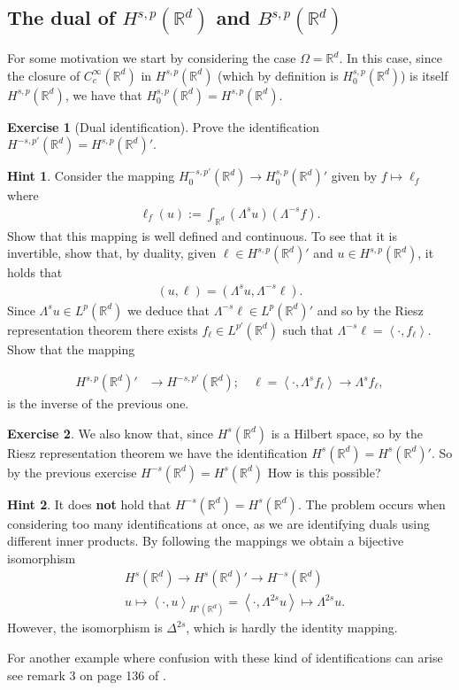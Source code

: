\documentclass[
    a4paper,
    DIV=14,
    abstract=true,
    numbers=noenddot
]
{scrartcl}
\theoremstyle{definition}
\newtheorem{exercise}{Exercise}
\newtheorem*{hint}{Hint}
\newcommand{\br}[1]{\left\langle#1\right\rangle}
\newcommand{\R}{\mathbb{R}}
\begin{document}
\subsection{The dual of $H^{s,p}(\R^d)$ and $B^{s,p}(\R^d)$}
For some motivation we start by considering the case $\Omega =\R^d$. In this case, since the closure of
$C_c^\infty(\R^d)$ in $H^{s,p}(\R^d)$ (which by definition is $H_0^{s,p}(\R^d)$) is itself $H^{s,p}(\R^d)$, we have that $H_0^{s,p}(\R^d)=H^{s,p}(\R^d)$.
\begin{exercise}[Dual identification]\label{dual exercise}
  Prove the identification $H^{-s,p'}(\R^d)=H^{s,p}(\R^d)'$.
\end{exercise}
\begin{hint}

  Consider the mapping  $H_0^{-s,p'}(\R^d) \to H^{s,p}_0(\R^d)'$ given by $f \mapsto \ell_f$ where
  \begin{align*}
    \ell_f(u):= \int_{\R^d}(\Lambda^s u)(\Lambda ^{-s}f).
  \end{align*}
  Show that this mapping is well defined and continuous. To see that it is invertible, show that, by duality, given $\ell \in H^{s,p}(\R^d)'$ and $u \in H^{s,p}(\R^d)$, it holds that
  \begin{align*}
    (u,\ell )=(\Lambda ^s u,\Lambda ^{-s}\ell ).
  \end{align*}
  Since $ \Lambda ^s u \in L^p(\R^d)$ we deduce that $\Lambda ^{-s}\ell \in L^{p}(\R^d)'$ and so by the Riesz representation theorem there exists $f_\ell \in L^{p'}(\R^d)$ such that $\Lambda ^{-s}\ell =\br{\cdot,f_\ell}$. Show that the mapping

  \begin{align*}
    H^{s,p}(\R^d)'                & \longrightarrow H^{-s,p'}(\R^d); \quad \ell = \br{\cdot, \Lambda^s  f_\ell} \to \Lambda^s  f_\ell,\end{align*}
  is the inverse of the previous one.
\end{hint}
\begin{exercise}
  We also know that, since $H^{s}(\R^d)$ is a Hilbert space, so by the Riesz representation theorem we have the identification $H^s(\R^d) = H^{s}(\R^d)'$. So by the previous exercise $H^{-s}(\R^d)= H^s(\R^d)$ How is this possible?
\end{exercise}
\begin{hint}
  It does \textbf{not} hold that $H^{-s}(\R^d)= H^s(\R^d)$. The problem occurs when considering too many identifications at once, as we are identifying duals using different inner products. By following the mappings we obtain a bijective isomorphism
  \begin{align*}
     & H^{s}(\R^d) \to  H^s(\R^d)' \to H^{-s}(\R^d)                                                    \\
     & u \longmapsto   \br{\cdot, u}_{H^s(\R^d)}= \br{\cdot, \Lambda^{2s} u } \mapsto \Lambda ^{2s} u.
  \end{align*}
  However, the isomorphism is $\Delta ^{2s}$, which is  hardly the identity mapping.
\end{hint}
For another example where confusion with these kind of identifications can arise see remark 3 on page  136 of \cite{brezis2011functional}.
\end{document}
